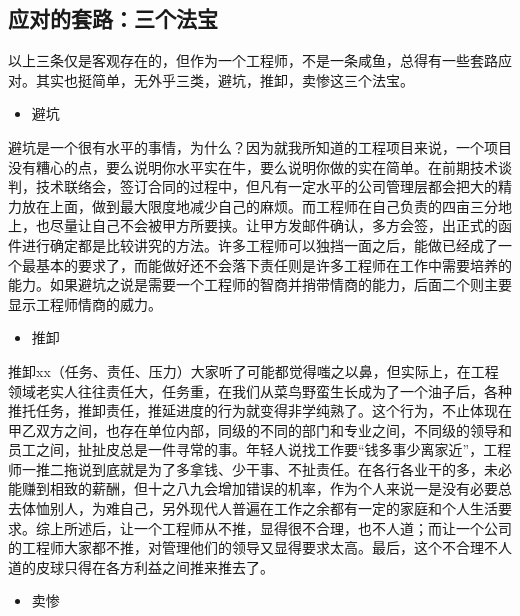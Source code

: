 \documentclass[
]{book}
\providecommand{\tightlist}{%
  \setlength{\itemsep}{0pt}\setlength{\parskip}{0pt}}
\begin{document}
\hypertarget{ux5e94ux5bf9ux7684ux5957ux8defux4e09ux4e2aux6cd5ux5b9d}{%
\subsection{应对的套路：三个法宝}\label{ux5e94ux5bf9ux7684ux5957ux8defux4e09ux4e2aux6cd5ux5b9d}}

以上三条仅是客观存在的，但作为一个工程师，不是一条咸鱼，总得有一些套路应对。其实也挺简单，无外乎三类，避坑，推卸，卖惨这三个法宝。

\begin{itemize}
\tightlist
\item
  避坑
\end{itemize}

避坑是一个很有水平的事情，为什么？因为就我所知道的工程项目来说，一个项目没有糟心的点，要么说明你水平实在牛，要么说明你做的实在简单。在前期技术谈判，技术联络会，签订合同的过程中，但凡有一定水平的公司管理层都会把大的精力放在上面，做到最大限度地减少自己的麻烦。而工程师在自己负责的四亩三分地上，也尽量让自己不会被甲方所要挟。让甲方发邮件确认，多方会签，出正式的函件进行确定都是比较讲究的方法。许多工程师可以独挡一面之后，能做已经成了一个最基本的要求了，而能做好还不会落下责任则是许多工程师在工作中需要培养的能力。如果避坑之说是需要一个工程师的智商并捎带情商的能力，后面二个则主要显示工程师情商的威力。

\begin{itemize}
\tightlist
\item
  推卸
\end{itemize}

推卸xx（任务、责任、压力）大家听了可能都觉得嗤之以鼻，但实际上，在工程领域老实人往往责任大，任务重，在我们从菜鸟野蛮生长成为了一个油子后，各种推托任务，推卸责任，推延进度的行为就变得非学纯熟了。这个行为，不止体现在甲乙双方之间，也存在单位内部，同级的不同的部门和专业之间，不同级的领导和员工之间，扯扯皮总是一件寻常的事。年轻人说找工作要``钱多事少离家近''，工程师一推二拖说到底就是为了多拿钱、少干事、不扯责任。在各行各业干的多，未必能赚到相致的薪酬，但十之八九会增加错误的机率，作为个人来说一是没有必要总去体恤别人，为难自己，另外现代人普遍在工作之余都有一定的家庭和个人生活要求。综上所述后，让一个工程师从不推，显得很不合理，也不人道；而让一个公司的工程师大家都不推，对管理他们的领导又显得要求太高。最后，这个不合理不人道的皮球只得在各方利益之间推来推去了。

\begin{itemize}
\tightlist
\item
  卖惨
\end{itemize}
\end{document}
